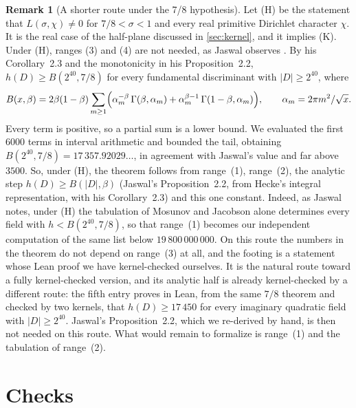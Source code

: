 \documentclass[11pt]{article}
\theoremstyle{definition}
\newtheorem{remark}[theorem]{Remark}
\begin{document}
\begin{remark}[A shorter route under the 7/8 hypothesis]\label{rem:H}
Let (H) be the statement that $L(\sigma,\chi) \ne 0$ for $7/8 < \sigma < 1$ and every real primitive Dirichlet
character $\chi$. It is the real case of the half-plane discussed in \cref{sec:kernel}, and it implies (K). Under (H),
ranges (3) and (4) are not needed, as Jaswal observes \cite[Remark~4.2]{Jaswal2026}. By his Corollary~2.3 and the
monotonicity in his Proposition~2.2, $h(D) \ge B(2^{40}, 7/8)$ for every fundamental discriminant with $|D| \ge 2^{40}$,
where
\[
  B(x,\beta) = 2\beta(1-\beta)\sum_{m\ge1}\Bigl(\alpha_m^{-\beta}\,\Gamma(\beta,\alpha_m)
  + \alpha_m^{\beta-1}\,\Gamma(1-\beta,\alpha_m)\Bigr), \qquad \alpha_m = 2\pi m^2/\sqrt{x}.
\]
Every term is positive, so a partial sum is a lower bound. We evaluated the first $6000$ terms in interval arithmetic
and bounded the tail, obtaining $B(2^{40}, 7/8) = 17\,357.92029\ldots$, in agreement with Jaswal's value and far above
$3500$. So, under (H), the theorem follows from range~(1), range~(2), the analytic step $h(D) \ge B(|D|,\beta)$ (Jaswal's
Proposition~2.2, from Hecke's integral representation, with his Corollary~2.3) and this one constant. Indeed, as Jaswal
notes, under (H) the tabulation of Mosunov and Jacobson alone determines every field with $h < B(2^{40},7/8)$, so that
range~(1) becomes our independent computation of the same list below $19\,800\,000\,000$. On this route the numbers in the
theorem do not depend on range~(3) at all, and the footing is a statement whose Lean proof we have kernel-checked
ourselves. It is the natural route toward a fully kernel-checked version, and its analytic half is already kernel-checked by a
different route: the fifth entry \cite{MurphyBounds} proves in Lean, from the same $7/8$ theorem and checked by two
kernels, that $h(D) \ge 17\,450$ for every imaginary quadratic field with $|D| \ge 2^{40}$. Jaswal's Proposition~2.2,
which we re-derived by hand, is then not needed on this route. What would remain to formalize is range~(1) and the
tabulation of range~(2).
\end{remark}

\section{Checks}\label{sec:checks}
\end{document}
